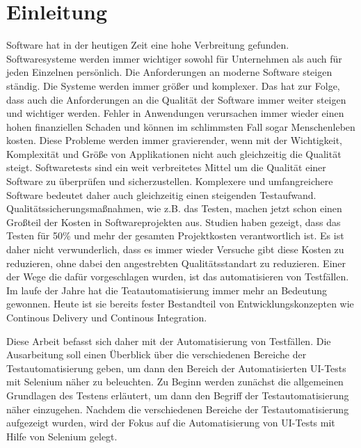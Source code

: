 \chapter{Einleitung}
\label{sec:einleitung}

Software hat in der heutigen Zeit eine hohe Verbreitung gefunden. Softwaresysteme werden immer wichtiger sowohl für Unternehmen als auch für jeden Einzelnen persönlich. Die Anforderungen an moderne Software steigen ständig. Die Systeme werden immer größer und komplexer. Das hat zur Folge, dass auch die Anforderungen an die Qualität der Software immer weiter steigen und wichtiger werden.
Fehler in Anwendungen verursachen immer wieder einen hohen finanziellen Schaden und können im schlimmsten Fall sogar Menschenleben kosten. Diese Probleme werden immer gravierender, wenn mit der Wichtigkeit, Komplexität und Größe von Applikationen nicht auch gleichzeitig die Qualität steigt. \cite{burnstein_practical_2003} \newline
Softwaretests sind ein weit verbreitetes Mittel um die Qualität einer Software zu überprüfen und sicherzustellen.
Komplexere und umfangreichere Software bedeutet daher auch gleichzeitig einen steigenden Testaufwand.\newline
Qualitätssicherungsmaßnahmen, wie z.B. das Testen, machen jetzt schon einen Großteil der Kosten in Softwareprojekten aus. Studien haben gezeigt, dass das Testen für 50\% und mehr der gesamten Projektkosten verantwortlich ist. \cite{ramler_economic_2006} 
Es ist daher nicht verwunderlich, dass es immer wieder Versuche gibt diese Kosten zu reduzieren, ohne dabei den angestrebten Qualitätsstandart zu reduzieren.
Einer der Wege die dafür vorgeschlagen wurden, ist das automatisieren von Testfällen. 
\cite{harrold_testing:_2000}
Im laufe der Jahre hat die Teatautomatisierung immer mehr an Bedeutung gewonnen. Heute ist sie bereits fester Bestandteil von Entwicklungskonzepten wie Continous Delivery und Continous Integration.

Diese Arbeit befasst sich daher mit der Automatisierung von Testfällen. Die Ausarbeitung soll einen Überblick über die verschiedenen Bereiche der Testautomatisierung geben, um dann den Bereich der Automatisierten UI-Tests mit Selenium näher zu beleuchten.
Zu Beginn werden zunächst die allgemeinen Grundlagen des Testens erläutert, um dann den Begriff der Testautomatisierung näher einzugehen. Nachdem die verschiedenen Bereiche der Testautomatisierung aufgezeigt wurden, wird der Fokus auf die Automatisierung von UI-Tests mit Hilfe von Selenium gelegt.





